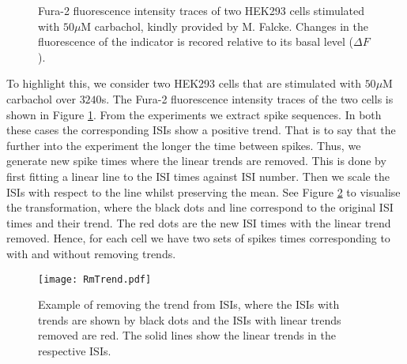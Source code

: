 \documentclass[12pt]{book} %
\begin{document}
 \begin{figure}[b!]
   \hrulefill
   \begin{center} 
     \quad
    \end{center}     
    \caption{Fura-2 fluorescence intensity traces of two HEK293 cells stimulated with  $50\mu\mathrm{M}$ carbachol, kindly provided by M. Falcke. Changes in the fluorescence of the  indicator is recored relative to its basal level ($\Delta F$).}
    \label{fig:tracetrend}
    \hrulefill
    \end{figure}

To highlight this, we consider two HEK293 cells  that are stimulated with $50\mu\mathrm{M}$ carbachol over $3240$s. The Fura-2 fluorescence intensity traces of the two cells is shown in Figure \ref{fig:tracetrend}. From the experiments we extract  spike sequences. In both these cases the corresponding ISIs show a positive trend. That is to say that the further into the experiment the longer the time between  spikes. Thus, we generate new  spike times where the linear trends are removed. This is done by first fitting a linear line to the ISI times against ISI number. Then we scale the ISIs with respect to the line whilst preserving the mean. See Figure \ref{fig:RmTrend} to visualise the transformation, where the black dots and line correspond to the original ISI times and their trend. The red dots are the new ISI times with the linear trend removed. Hence, for each cell we have two sets of  spikes times corresponding to with and without removing trends. 

   \begin{figure}[t!]
   \hrulefill
   \begin{center} 
    {\texttt{[image: RmTrend.pdf]} }
    \end{center}     
    \caption{Example of removing the trend from ISIs, where the ISIs with trends are shown by black dots and the ISIs with linear trends removed are red. The solid lines show the linear trends in the respective ISIs. }
    \label{fig:RmTrend}
    \hrulefill
    \end{figure}
\end{document}
